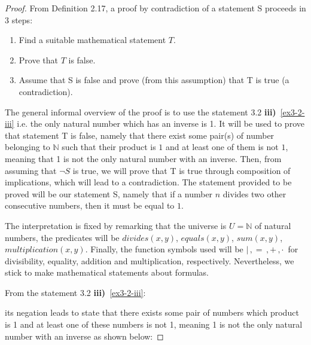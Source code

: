 \documentclass[unicode,11pt,a4paper,oneside,numbers=endperiod,openany]{scrartcl}
\newcommand{\myex}[3]{
    \ifthenelse{\equal{#1}{true}}{
        \begin{equation} \label{#2} \begin{aligned} #3 \end{aligned} \end{equation}
    }{
        \begin{equation*} \label{#2} \begin{aligned} #3 \end{aligned} \end{equation*}
    }
}
\begin{document}
\begin{proof}
    From Definition 2.17, a proof by contradiction of a statement S proceeds in 3 steps:
    \begin{enumerate}
        \item Find a suitable mathematical statement \( T \).
        \item Prove that \( T \) is false.
        \item Assume that S is false and prove (from this assumption) 
            that T is true (a contradiction).
    \end{enumerate}

    The general informal overview of the proof is to use the statement 3.2 
    \textbf{iii)}~\ref{ex3-2-iii} 
    i.e. the only natural number which has an inverse is 1.
    It will be used to prove that statement T is false,
    namely that there exist some pair(s) of number belonging to \( \mathbb{N} \) 
    such that their product is \( 1 \) and at least one of them is not \( 1 \),
    meaning that 1 is not the only natural number with an inverse.
    Then, from assuming that \( \neg S \) is true, 
    we will prove that T is true through composition of implications, 
    which will lead to a contradiction. 
    The statement provided to be proved will be our statement S,
    namely that if a number \( n \) divides two other consecutive numbers, 
    then it must be equal to \( 1 \).


    The interpretation is fixed 
    by remarking that the universe is \( U = \mathbb{N} \) of natural numbers, 
    the predicates will be \( divides(x, y) \), \( equals(x, y) \), 
    \( sum(x,y) \), \( multiplication(x,y) \).
    Finally, the function symbols used will be \( | \,, = \,, + \,, \cdot \, \) 
    for divisibility, equality, addition and multiplication, respectively.
    Nevertheless, we stick to make mathematical statements about formulas.

    From the statement 3.2 \textbf{iii)}~\ref{ex3-2-iii}: 
    \myex{false}{ex8-iii}{
        \forall x \; \forall y \; %
        \left( 
            \left(
                x \cdot y = 1
            \right)
            \longrightarrow 
            \left(
                \left( x = 1 \right) 
                \land
                \left( y = 1 \right)
            \right)
        \right)
    }

    its negation leads to state that there exists some pair of numbers which product is 1
    and at least one of these numbers is not 1, 
    meaning 1 is not the only natural number with an inverse as shown below:


\end{proof}
\end{document}
